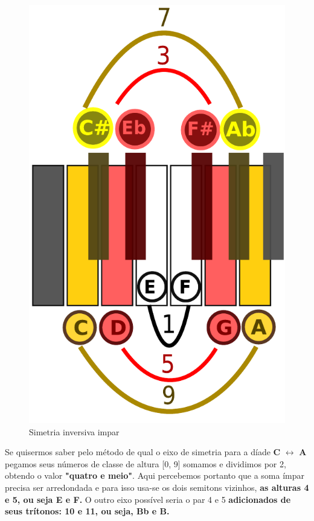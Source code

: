 \documentclass[
	12pt,				%
	openright,			%
	twoside,			%
	a4paper,			%
	english,			%
	french,				%
	spanish,			%
	brazil				%
	]{abntex2}
\begin{document}
\begin{figure}[!h]
	\caption{\label{fig_grafico}Simetria inversiva impar}
	\begin{center}
	    \includegraphics[scale=0.4]{axis/simetriainversiva_impar.pdf}
	\end{center}
\end{figure}

Se quisermos saber pelo método de  qual o eixo de simetria para a díade \textbf{C} $\leftrightarrow $ \textbf{A} pegamos seus números de classe de altura [0, 9] somamos e dividimos por 2, obtendo o valor \textbf{"quatro e meio"}. Aqui percebemos portanto que a soma ímpar precisa ser arredondada e para isso usa-se os dois semitons vizinhos, \textbf{as alturas 4 e 5, ou seja E e F.} 
O outro eixo possível seria o par 4 e 5 \textbf{adicionados de seus trítonos: 10 e 11, ou seja, Bb e B.}
\end{document}

